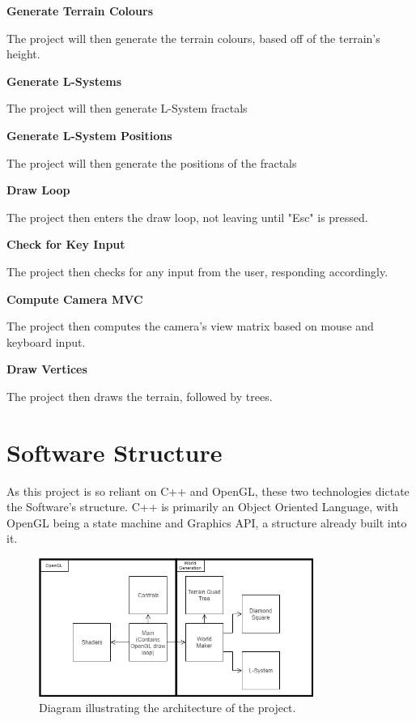 \documentclass[a4paper,10pt]{report}
\begin{document}
\textbf{Generate Terrain Colours} \par
The project will then generate the terrain colours, based off of the terrain's height. \medskip

\textbf{Generate L-Systems} \par
The project will then generate L-System fractals \medskip

\textbf{Generate L-System Positions} \par 
The project will then generate the positions of the fractals \medskip

\textbf{Draw Loop} \par
The project then enters the draw loop, not leaving until "Esc" is pressed. \medskip

\textbf{Check for Key Input} \par 
The project then checks for any input from the user, responding accordingly. \medskip

\textbf{Compute Camera MVC} \par 
The project then computes the camera's view matrix based on mouse and keyboard input. \medskip

\textbf{Draw Vertices} \par 
The project then draws the terrain, followed by trees. \medskip

\section{Software Structure}
As this project is so reliant on C++ and OpenGL, these two technologies dictate the Software's structure. C++ is primarily an Object Oriented Language, with OpenGL being a state machine and Graphics API, a structure already built into it. \\

\begin{figure}[h!]
    \centering
\includegraphics[width=0.8\textwidth]{Images/Charts/Architecture.png} 
\caption{Diagram illustrating the architecture of the project.}
\label{architecture}
\end{figure} 
\end{document}
